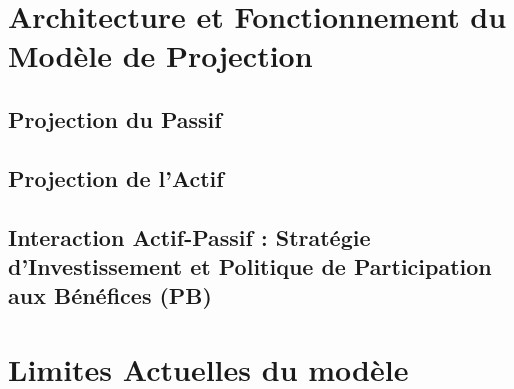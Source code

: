 \section{Architecture et Fonctionnement du Modèle de Projection}
    \subsection{Projection du Passif}
    \subsection{Projection de l'Actif}
    \subsection{Interaction Actif-Passif : Stratégie d'Investissement et Politique de Participation aux Bénéfices (PB)}

\section{Limites Actuelles du modèle}




